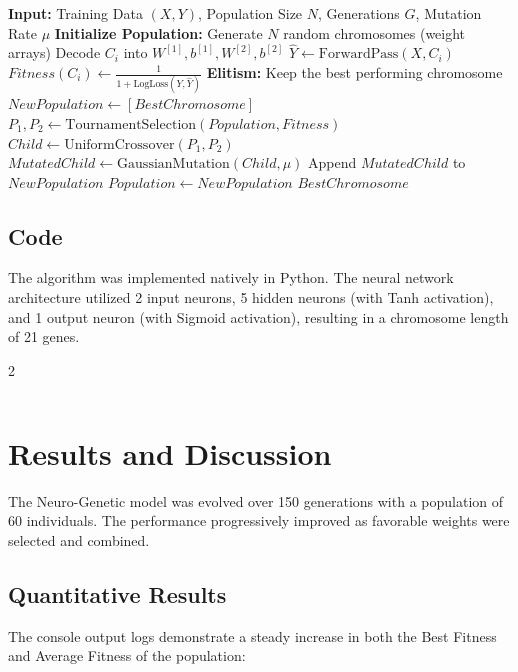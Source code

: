 \documentclass[11pt]{article}
\begin{document}
\begin{algorithm}[H]
    \caption{Neuro-Genetic Optimization}
    \begin{algorithmic}[1]
        \State \textbf{Input:} Training Data $(X, Y)$, Population Size $N$, Generations $G$, Mutation Rate $\mu$
        \State \textbf{Initialize Population:} Generate $N$ random chromosomes (weight arrays)
        \State Decode $C_i$ into $W^{[1]}, b^{[1]}, W^{[2]}, b^{[2]}$
        \State $\hat{Y} \gets \text{ForwardPass}(X, C_i)$
        \State $Fitness(C_i) \gets \frac{1}{1 + \text{LogLoss}(Y, \hat{Y})}$
        \EndFor
        \State \textbf{Elitism:} Keep the best performing chromosome
        \State $NewPopulation \gets [BestChromosome]$
        \State $P_1, P_2 \gets \text{TournamentSelection}(Population, Fitness)$
        \State $Child \gets \text{UniformCrossover}(P_1, P_2)$
        \State $MutatedChild \gets \text{GaussianMutation}(Child, \mu)$
        \State Append $MutatedChild$ to $NewPopulation$
        \EndWhile
        \State $Population \gets NewPopulation$
        \EndFor
        \State \Return $BestChromosome$
    \end{algorithmic}
\end{algorithm}

\subsection{Code}
The algorithm was implemented natively in Python. The neural network architecture utilized 2 input neurons, 5 hidden neurons (with Tanh activation), and 1 output neuron (with Sigmoid activation), resulting in a chromosome length of 21 genes.

\begin{multicols}{2}
    \inputminted{python}{./assets/neuro_genetic.py}
\end{multicols}

\section{Results and Discussion}
The Neuro-Genetic model was evolved over 150 generations with a population of 60 individuals. The performance progressively improved as favorable weights were selected and combined.

\subsection{Quantitative Results}
The console output logs demonstrate a steady increase in both the Best Fitness and Average Fitness of the population:
\end{document}

